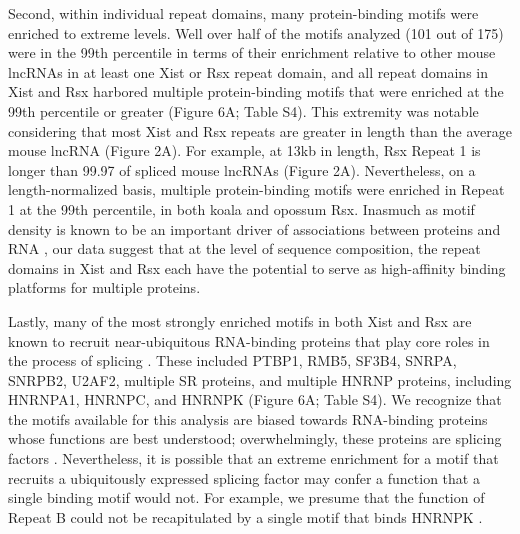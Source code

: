 Second, within individual repeat domains, many protein-binding motifs were enriched to extreme levels. Well over half of the motifs analyzed (101 out of 175) were in the 99th percentile in terms of their enrichment relative to other mouse lncRNAs in at least one Xist or Rsx repeat domain, and all repeat domains in Xist and Rsx harbored multiple protein-binding motifs that were enriched at the 99th percentile or greater (Figure 6A; Table S4). This extremity was notable considering that most Xist and Rsx repeats are greater in length than the average mouse lncRNA (Figure 2A). For example, at 13kb in length, Rsx Repeat 1 is longer than 99.97 of spliced mouse lncRNAs (Figure 2A). Nevertheless, on a length-normalized basis, multiple protein-binding motifs were enriched in Repeat 1 at the 99th percentile, in both koala and opossum Rsx. Inasmuch as motif density is known to be an important driver of associations between proteins and RNA \cite{Dominguez2018SequenceProteins,Kirk2018FunctionalContent,VanNostrand2016RobusteCLIP}, our data suggest that at the level of sequence composition, the repeat domains in Xist and Rsx each have the potential to serve as high-affinity binding platforms for multiple proteins.

Lastly, many of the most strongly enriched motifs in both Xist and Rsx are known to recruit near-ubiquitous RNA-binding proteins that play core roles in the process of splicing \cite{Wahl2015Snapshot:I}. These included PTBP1, RMB5, SF3B4, SNRPA, SNRPB2, U2AF2, multiple SR proteins, and multiple HNRNP proteins, including HNRNPA1, HNRNPC, and HNRNPK (Figure 6A; Table S4). We recognize that the motifs available for this analysis are biased towards RNA-binding proteins whose functions are best understood; overwhelmingly, these proteins are splicing factors \cite{Dominguez2018SequenceProteins,Ray2013ARegulation}. Nevertheless, it is possible that an extreme enrichment for a motif that recruits a ubiquitously expressed splicing factor may confer a function that a single binding motif would not. For example, we presume that the function of Repeat B could not be recapitulated by a single motif that binds HNRNPK \cite{Pintacuda2017HnRNPKSilencing}. 


